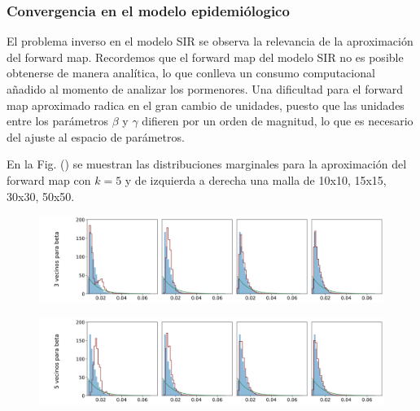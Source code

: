 \newpage

\newpage

\newpage

\newpage


\subsubsection{Convergencia en el modelo epidemiólogico}

El problema inverso en el modelo SIR se observa la relevancia de la aproximación del forward map. Recordemos que el forward map del modelo SIR no es posible obtenerse de manera analítica, lo que conlleva un consumo computacional añadido al momento de analizar los pormenores. Una dificultad para el forward map aproximado radica en el gran cambio de unidades, puesto que las unidades entre los parámetros $\beta$ y $\gamma$ difieren por un orden de magnitud, lo que es necesario del ajuste al espacio de parámetros. 







En la Fig. () se muestran las distribuciones marginales para la aproximación del forward map con $k = 5$ y de izquierda a derecha una malla de 10x10, 15x15, 30x30, 50x50.


\begin{figure}[H] 
    \centering 
    \includegraphics[width = 17 cm ]{img/Exp_Central_SIR_Sigma/Figuras/Generales/Convergencia_theta1_1_SIR_sigma.png} 
\end{figure} 

\begin{figure}[H] 
    \centering 
    \includegraphics[width = 17 cm ]{img/Exp_Central_SIR_Sigma/Figuras/Generales/Convergencia_theta1_2_SIR_sigma.png} 
\end{figure} 

